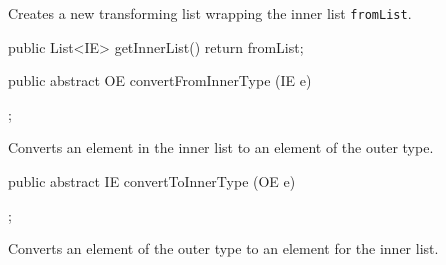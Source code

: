 \begin{tabb}   Creates a new transforming list wrapping
 the inner list \texttt{fromList}.
\end{tabb}
\begin{htmlonly}
\end{htmlonly}
\begin{code}\begin{hide}

   public List<IE> getInnerList() {
      return fromList;
   }\end{hide}

   public abstract OE convertFromInnerType (IE e)\begin{hide};\end{hide}
\end{code}
\begin{tabb} Converts an element in the inner list to
 an element of the outer type.
\end{tabb}
\begin{htmlonly}
\end{htmlonly}
\begin{code}

   public abstract IE convertToInnerType (OE e)\begin{hide};\end{hide}
\end{code}
\begin{tabb} Converts an element of the outer type to
 an element for the inner list.
\end{tabb}
\begin{htmlonly}
\end{htmlonly}
